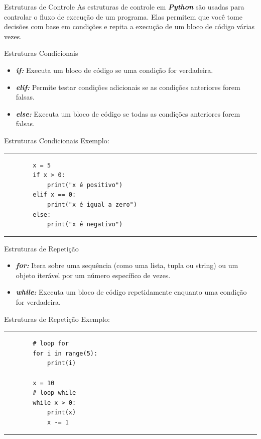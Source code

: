 \documentclass{beamer}
\begin{document}
\begin{frame}{Estruturas de Controle}
	As estruturas de controle em \textbf{\textit{Python}} são usadas para controlar o fluxo de execução de um programa. Elas permitem que você tome decisões com base em condições e repita a execução de um bloco de código várias vezes.
\end{frame}

\begin{frame}[fragile]{Estruturas Condicionais}
	\begin{itemize}
		\item  \textbf{\textit{if:}} Executa um bloco de código se uma condição for verdadeira.
		\item \textbf{\textit{elif:}} Permite testar condições adicionais se as condições anteriores forem falsas.
		\item \textbf{\textit{else:}} Executa um bloco de código se todas as condições anteriores forem falsas.
	\end{itemize}
\end{frame}

\begin{frame}[fragile]{Estruturas Condicionais}
	Exemplo:
	\rule{\textwidth}{1pt}
	\scriptsize
	\begin{verbatim}
		x = 5
		if x > 0:
			print("x é positivo")
		elif x == 0:
			print("x é igual a zero")
		else:
			print("x é negativo")
	\end{verbatim}
	\rule{\textwidth}{1pt}
\end{frame}


\begin{frame}[fragile]{Estruturas de Repetição}

	\begin{itemize}
		\item  \textbf{\textit{for:}} Itera sobre uma sequência (como uma lista, tupla ou string) ou um objeto iterável por um número específico de vezes.
		\item \textbf{\textit{while:}} Executa um bloco de código repetidamente enquanto uma condição for verdadeira.
	\end{itemize}
\end{frame}

\begin{frame}[fragile]{Estruturas de Repetição}
	Exemplo:
	\rule{\textwidth}{1pt}
	\scriptsize	
	\begin{verbatim}
		# loop for
		for i in range(5):
			print(i)
		
		x = 10
		# loop while
		while x > 0:
			print(x)
			x -= 1
	\end{verbatim}
	\rule{\textwidth}{1pt}
	
\end{frame}
\end{document}
